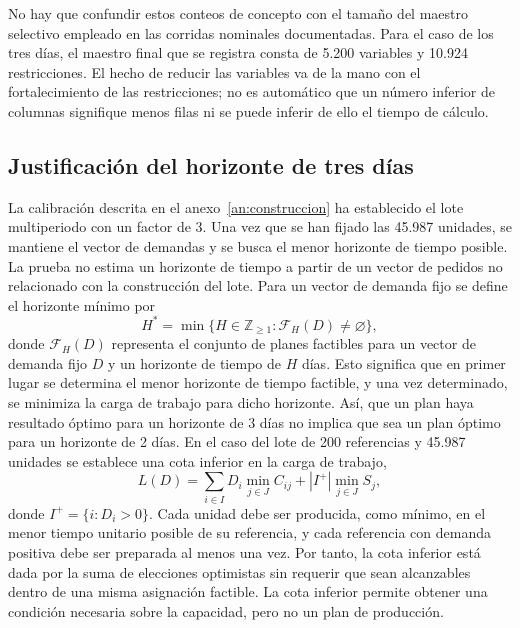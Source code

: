 \documentclass[12pt,a4paper,oneside]{article}
\begin{document}
No hay que confundir estos conteos de concepto con el tamaño del maestro selectivo empleado en las corridas nominales documentadas. Para el caso de los tres días, el maestro final que se registra consta de 5.200 variables y 10.924 restricciones. El hecho de reducir las variables va de la mano con el fortalecimiento de las restricciones; no es automático que un número inferior de columnas signifique menos filas ni se puede inferir de ello el tiempo de cálculo.


\subsection{Justificación del horizonte de tres días}\label{sec:horizonte}
La calibración descrita en el anexo~\ref{an:construccion} ha establecido el lote multiperiodo con un factor de 3. Una vez que se han fijado las 45.987 unidades, se mantiene el vector de demandas y se busca el menor horizonte de tiempo posible. La prueba no estima un horizonte de tiempo a partir de un vector de pedidos no relacionado con la construcción del lote. Para un vector de demanda fijo se define el horizonte mínimo por
\begin{equation}
	H^*=\min\{H\in\mathbb Z_{\geq1}:\mathcal F_H(D)\neq\varnothing\},
	\label{eq:hmin}
\end{equation}
donde $\mathcal F_H(D)$ representa el conjunto de planes factibles para un vector de demanda fijo $D$ y un horizonte de tiempo de $H$ días. Esto significa que en primer lugar se determina el menor horizonte de tiempo factible, y una vez determinado, se minimiza la carga de trabajo para dicho horizonte. Así, que un plan haya resultado óptimo para un horizonte de 3 días no implica que sea un plan óptimo para un horizonte de 2 días.
En el caso del lote de 200 referencias y 45.987 unidades se establece una cota inferior en la carga de trabajo,
\begin{equation}
	L(D)=\sum_{i\in I}D_i\min_{j\in J}C_{ij}
	+ |I^+|\min_{j\in J}S_j,
	\label{eq:cotaH}
\end{equation}
donde $I^+=\{i:D_i>0\}$. Cada unidad debe ser producida, como mínimo, en el menor tiempo unitario posible de su referencia, y cada referencia con demanda positiva debe ser preparada al menos una vez. Por tanto, la cota inferior está dada por la suma de elecciones optimistas sin requerir que sean alcanzables dentro de una misma asignación factible. La cota inferior permite obtener una condición necesaria sobre la capacidad, pero no un plan de producción.
\end{document}
